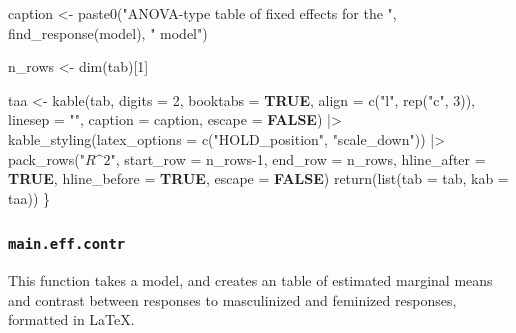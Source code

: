\documentclass[
  bookmarksnumbered]{article}
\newenvironment{Shaded}{\begin{snugshade}}{\end{snugshade}}
\newcommand{\AttributeTok}[1]{\textcolor[rgb]{0.80,0.80,0.80}{#1}}
\newcommand{\ConstantTok}[1]{\textcolor[rgb]{0.86,0.64,0.64}{\textbf{#1}}}
\newcommand{\DecValTok}[1]{\textcolor[rgb]{0.86,0.86,0.80}{#1}}
\newcommand{\FunctionTok}[1]{\textcolor[rgb]{0.94,0.94,0.56}{#1}}
\newcommand{\NormalTok}[1]{\textcolor[rgb]{0.80,0.80,0.80}{#1}}
\newcommand{\OtherTok}[1]{\textcolor[rgb]{0.94,0.94,0.56}{#1}}
\newcommand{\SpecialCharTok}[1]{\textcolor[rgb]{0.86,0.64,0.64}{#1}}
\newcommand{\StringTok}[1]{\textcolor[rgb]{0.80,0.58,0.58}{#1}}
\begin{document}
\begin{Shaded}
\begin{Highlighting}[]
\NormalTok{  caption }\OtherTok{\textless{}{-}} \FunctionTok{paste0}\NormalTok{(}\StringTok{"ANOVA{-}type table of fixed effects for the "}\NormalTok{, }\FunctionTok{find\_response}\NormalTok{(model), }\StringTok{" model"}\NormalTok{)}
  
\NormalTok{  n\_rows }\OtherTok{\textless{}{-}} \FunctionTok{dim}\NormalTok{(tab)[}\DecValTok{1}\NormalTok{]}
  
\NormalTok{  taa }\OtherTok{\textless{}{-}} \FunctionTok{kable}\NormalTok{(tab,}
               \AttributeTok{digits =} \DecValTok{2}\NormalTok{,}
               \AttributeTok{booktabs =} \ConstantTok{TRUE}\NormalTok{,}
               \AttributeTok{align =} \FunctionTok{c}\NormalTok{(}\StringTok{"l"}\NormalTok{, }\FunctionTok{rep}\NormalTok{(}\StringTok{"c"}\NormalTok{, }\DecValTok{3}\NormalTok{)),}
               \AttributeTok{linesep =} \StringTok{""}\NormalTok{,}
               \AttributeTok{caption =}\NormalTok{ caption,}
               \AttributeTok{escape =} \ConstantTok{FALSE}\NormalTok{) }\SpecialCharTok{|\textgreater{}}
    \FunctionTok{kable\_styling}\NormalTok{(}\AttributeTok{latex\_options =} \FunctionTok{c}\NormalTok{(}\StringTok{"HOLD\_position"}\NormalTok{, }\StringTok{"scale\_down"}\NormalTok{)) }\SpecialCharTok{|\textgreater{}}
    \FunctionTok{pack\_rows}\NormalTok{(}\StringTok{"$R\^{}2$"}\NormalTok{,}
              \AttributeTok{start\_row =}\NormalTok{ n\_rows}\DecValTok{{-}1}\NormalTok{, }\AttributeTok{end\_row =}\NormalTok{ n\_rows,}
              \AttributeTok{hline\_after =} \ConstantTok{TRUE}\NormalTok{, }\AttributeTok{hline\_before =} \ConstantTok{TRUE}\NormalTok{,}
              \AttributeTok{escape =} \ConstantTok{FALSE}\NormalTok{)}
  \FunctionTok{return}\NormalTok{(}\FunctionTok{list}\NormalTok{(}\AttributeTok{tab =}\NormalTok{ tab, }\AttributeTok{kab =}\NormalTok{ taa))}
\NormalTok{\}}
\end{Highlighting}
\end{Shaded}

\subsubsection{\texorpdfstring{\texttt{main.eff.contr}}{main.eff.contr}}\label{main.eff.contr}

This function takes a model, and creates an table of estimated marginal means and contrast between responses to masculinized and feminized responses, formatted in \LaTeX.
\end{document}
